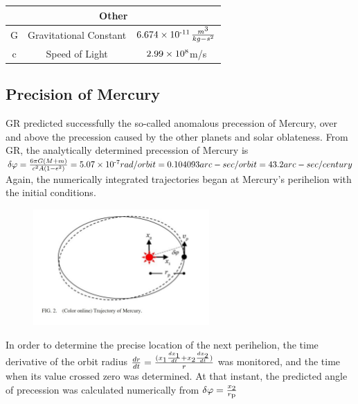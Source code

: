 \documentclass[12pt]{article}
\begin{document}
\begin{table}[h!]
    \centering
    \begin{tabular}{ccc}
         \multicolumn{3}{c}{Other}  \\
         \hline
         G & Gravitational Constant & $6.674\times10\textsuperscript{-11}$$\frac{m\textsuperscript{3}}{kg-s^2}$\\
         \hline
         c & Speed of Light & $2.99\times10\textsuperscript{8}$m/s\\
         \hline 
    \end{tabular}
    \label{tab:my_label}
\end{table}


 \subsection{Precision of Mercury}
 GR predicted successfully the so-called anomalous precession of Mercury, over and above the precession caused by
the other planets and solar oblateness. From GR, the analytically determined precession of Mercury is \\
$\delta \varphi  =\frac{6\pi G(M+m)}{c^2 A(1-e^2)} \\
=5.07\times 10\textsuperscript{-7}   rad/orbit \\
=0.104093  arc-sec/orbit \\
=43.2  arc-sec/century \\
$
Again, the numerically integrated trajectories began at
Mercury’s perihelion with the initial conditions.
\begin{figure}[htbp]
    \includegraphics[width=0.6\textwidth, right]{IMG_20210218_183609.jpg}
\end{figure}
In order
to determine the precise location of the next perihelion, the
time derivative of the orbit radius 
$\frac{dr}{dt}=\frac{(x\textsubscript{1}\frac{dx\textsubscript{1}}{dt}+x\textsubscript{2}\frac{dx\textsubscript{2}}{dt})}{r} $
was monitored, and the time when its value crossed zero was
determined. At that instant, the predicted angle of precession
was calculated numerically from $\delta \varphi = \frac{x\textsubscript{2}}{r\textsubscript{p}}$ \\
\end{document}
